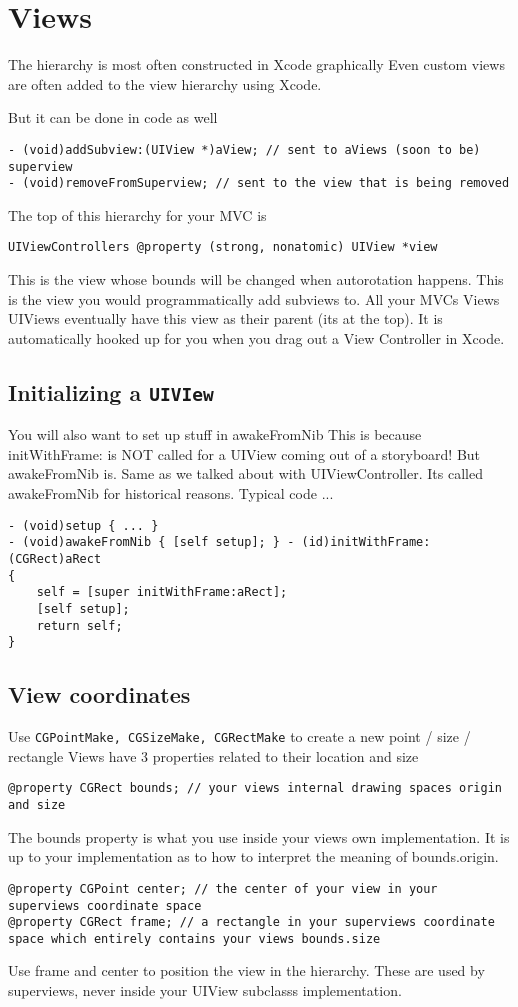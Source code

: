 \documentclass[12pt]{article}
\newcommand{\co}{\texttt}
\begin{document}
\section{Views}
The hierarchy is most often constructed in Xcode graphically Even custom views are often added to the view hierarchy using Xcode.

But it can be done in code as well
\begin{lstlisting}
- (void)addSubview:(UIView *)aView; // sent to aViews (soon to be) superview 
- (void)removeFromSuperview; // sent to the view that is being removed
\end{lstlisting}
The top of this hierarchy for your MVC is
\begin{lstlisting}
UIViewControllers @property (strong, nonatomic) UIView *view
\end{lstlisting}
This is the view whose bounds will be changed when autorotation happens.
This is the view you would programmatically add subviews to.
All your MVCs Views UIViews eventually have this view as their parent (its at the top). It is automatically hooked up for you when you drag out a View Controller in Xcode.

\subsection{Initializing a \co{UIVIew}}
You will also want to set up stuff in awakeFromNib
This is because initWithFrame: is NOT called for a UIView coming out of a storyboard!
But awakeFromNib is. Same as we talked about with UIViewController. Its called awakeFromNib for historical reasons.
Typical code ...
\begin{lstlisting}
- (void)setup { ... }
- (void)awakeFromNib { [self setup]; } - (id)initWithFrame:(CGRect)aRect
{
    self = [super initWithFrame:aRect];
    [self setup];
    return self;
}
\end{lstlisting}

\subsection{View coordinates}
Use \co{CGPointMake, CGSizeMake, CGRectMake} to create a new point / size / rectangle
Views have 3 properties related to their location and size 
\begin{lstlisting}
@property CGRect bounds; // your views internal drawing spaces origin and size
\end{lstlisting}
The bounds property is what you use inside your views own implementation.
It is up to your implementation as to how to interpret the meaning of bounds.origin.
\begin{lstlisting}
@property CGPoint center; // the center of your view in your superviews coordinate space 
@property CGRect frame; // a rectangle in your superviews coordinate space which entirely contains your views bounds.size
\end{lstlisting}
Use frame and center to position the view in the hierarchy.
These are used by superviews, never inside your UIView subclasss implementation.
\end{document}
